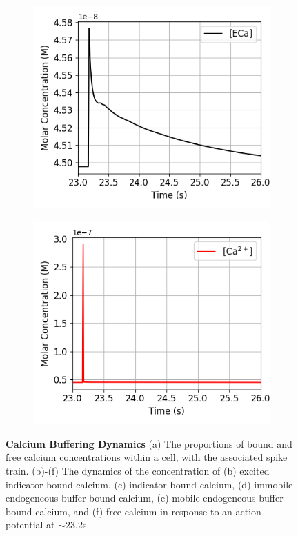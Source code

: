 \documentclass[a4paper,12pt]{article}
\theoremstyle{definition}
\begin{document}
\begin{figure}[h]
\begin{subfigure}{0.3\textwidth}
    \includegraphics[width=\textwidth]{figures/concentration_dynamics_18_zoomed_ECa.png}
    \caption{}
  \end{subfigure}
  \begin{subfigure}{0.3\textwidth}
    \includegraphics[width=\textwidth]{figures/concentration_dynamics_18_zoomed_Ca.png}
    \caption{}
  \end{subfigure}
  \caption{\textbf{Calcium Buffering Dynamics } (a) The proportions of bound and free calcium concentrations within a cell, with the associated spike train. (b)-(f) The dynamics of the concentration of (b) excited indicator bound calcium, (c) indicator bound calcium, (d) immobile endogeneous buffer bound calcium, (e) mobile endogeneous buffer bound calcium, and (f) free calcium in response to an action potential at $\sim$23.2s.}
  \label{fig:concentrations}
\end{figure}
\end{document}
